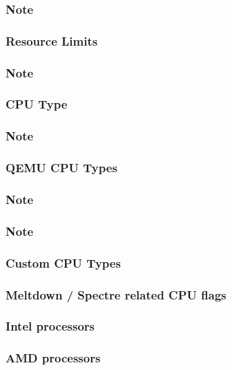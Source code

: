 \subsubsection{Note}

\subsubsection{Resource Limits}

\subsubsection{Note}

\subsubsection{CPU Type}

\subsubsection{Note}

\subsubsection{QEMU CPU Types}

\subsubsection{Note}

\subsubsection{Note}

\subsubsection{Custom CPU Types}

\subsubsection{Meltdown / Spectre related CPU flags}

\subsubsection{Intel processors}

\subsubsection{AMD processors}

